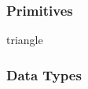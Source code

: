 \documentclass[xcolor=dvipsnames]{beamer}
\begin{document}
\begin{frame}
\frametitle{Primitives}
triangle
\end{frame}




\begin{frame}
\frametitle{Data Types}
\end{frame}

\end{document}
